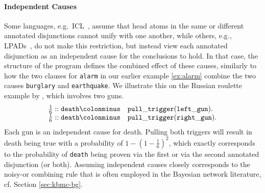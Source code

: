 \documentclass[a4paper]{article}
\begin{document}
\paragraph{Independent Causes}\label{sec:noisy-or-in-lp} 
Some languages, e.g.~ICL~\citep{Poole08}, assume that head atoms in
the  same or different annotated disjunctions cannot unify with one
another, while others, e.g., LPADs~\citep{Vennekens04}, do not make
this restriction, but instead view each annotated disjunction as an 
independent cause for the conclusions to hold. In that case, the
structure of the program defines the combined effect of these causes,
similarly to how the two clauses for \verb|alarm| in our earlier
example \eqref{ex:alarm} combine the two causes \verb|burglary| and \verb|earthquake|.  
We illustrate this on the Russian roulette example by \cite{vennekens:tplp09},
which involves two guns.
\begin{equation*}
\begin{array}{ll}
\frac{1}{6}::\mathtt{death}  \mathtt{\colonminus} & \mathtt{pull\_trigger(left\_gun).}\\
\frac{1}{6}::\mathtt{death}  \mathtt{\colonminus} & \mathtt{pull\_trigger(right\_gun).}\\
\end{array}
\end{equation*}
Each gun is an independent cause for death. Pulling both triggers will
result in death being true with a probability of $1 -(1-\frac{1}{6})^2$,
which exactly corresponds to the probability of \verb|death| being
proven via the first or via the second annotated disjunction (or
both). 
Assuming independent causes closely corresponds to the noisy-or combining rule 
that is often employed in the Bayesian network literature, cf. Section
\ref{sec:kbmc-bg}. 
\end{document}
